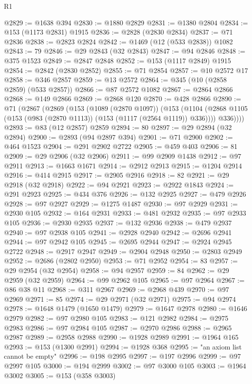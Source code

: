 \begin{lexlean}{R1}
\begin{coremodule}
{{{{{{{{{{{{{{{{{{{{{{{{{{{{{{{{{{{{{{{{{{{{{{{{{{{{{{{{{{{{{{{{{{{{{{{{{{{{{{{{{{{{{{{{{{{{{{{{{{{{{{{{{{{{{{{{{{{{{{{{{{{{{{{{{{{{{{{{{{{{{{{{{{{{{{{{{{{{{{{{{{{{{{{{{{{{{{{{{{{{{{{{{{@2829 := @1638 @394
@2830 := @1880 @2829
@2831 := @1380 @2804
@2834 := @153 (@1173 @2831) @1915
@2836 := @2828 (@2830 @2834)
@2837 := @71 @2836
@2838 := @2823 @2824
@2842 := @1469 (@12 (@533 @2838)) @1082
@2843 := 79
@2846 := @29 @2843 (@32 @2843)
@2847 := @94 @2846
@2848 := @375 @1523
@2849 := @2847 @2848
@2852 := @153 (@1117 @2849) @1915
@2854 := @2842 (@2830 @2852)
@2855 := @71 @2854
@2857 := @10 @2572 @17
@2858 := @346 @2857
@2859 := @13 @2572
@2864 := @345 (@10 (@2858 @2859) (@533 @2857))
@2866 := @87 @2572 @1082
@2867 := @2864 @2866
@2868 := @149 @2866
@2869 := @2868 @120
@2870 := @428 @2866
@2890 := @71
    (@2867
      (@2869
        (@153
          (@1089 (@2870 @1097))
          (@153
            (@1104 (@2868 @1105 (@153 (@983 (@2870 @1113)) (@153 (@1117 (@2564 @1119)) @336))))
            @336))))
@2893 := @83 (@12 @2857) @2859
@2894 := 80
@2897 := @29 @2894 (@32 @2894)
@2900 := @2893 (@94 @2897 @394)
@2901 := @71 @2900
@2902 := @464 @1523
@2904 := @291 @2902 @2722
@2905 := @459 @403
@2906 := 81
@2909 := @29 @2906 (@32 @2906)
@2911 := @99 @2909 @1438
@2912 := @97 @2911
@2913 := @1663 @1671
@2914 := @2912 @2913
@2915 := @1204 @2914
@2916 := @414 @2915
@2917 := @2905 @2916
@2918 := 82
@2921 := @29 @2918 (@32 @2918)
@2922 := @94 @2921
@2923 := @2922 @1843
@2924 := @291 @2923
@2925 := @434 @376
@2926 := @132 @2925
@2927 := @479 @2926
@2928 := @97 @2927
@2929 := @1275 @1487
@2930 := @97 @2929
@2931 := @2930 @105
@2932 := @164 @2931
@2933 := @481 @2932
@2935 := @97 @2933 @105
@2936 := @2930 @2935
@2937 := @132 @2936
@2938 := @479 @2937
@2940 := @97 @2938 @105
@2941 := @2928 @2940
@2942 := @2696 @2941
@2944 := @97 @2942 @105
@2945 := @2695 @2944
@2947 := @2924 @2945 @2722
@2948 := @2917 @2947
@2949 := @2904 @2948
@2950 := @2803 @2949
@2952 := @2686 (@2802 @2950)
@2953 := @71 @2952
@2954 := 83
@2957 := @29 @2954 (@32 @2954)
@2958 := @94 @2957
@2959 := 84
@2962 := @29 @2959 (@32 @2959)
@2964 := @99 @2962 @105
@2965 := @97 @2964
@2967 := @86 @38 @11
@2968 := @311 @2967
@2969 := @2968 @439
@2970 := @97 @2969
@2971 := 85
@2974 := @29 @2971 (@32 @2971)
@2975 := @94 @2974
@2978 := @1648 @1479 (@1650 @1479)
@2979 := @1647 @2978
@2980 := @1646 @2979
@2982 := @97 @2980 @105
@2983 := @121 @2982
@2984 := @2975 @2983
@2986 := @97 @2984 @105
@2987 := @2970 @2986
@2988 := @2965 @2987
@2989 := @2958 @2988
@2990 := @1928 @2989
@2991 := @1964 @165
@2993 := @153 (@1300 @2991)
@2994 := @1928 @368
@2995 := "an axiom list cannot be empty"
@2996 := @198 @2995
@2997 := @197 @2996
@2999 := @97 @2997 @105
@3000 := @194 @2999
@3002 := @97 @3000 @105
@3003 := @1964 @3002
@3005 := @153 (@358 @3003)
}}}}}}}}}}}}}}}}}}}}}}}}}}}}}}}}}}}}}}}}}}}}}}}}}}}}}}}}}}}}}}}}}}}}}}}}}}}}}}}}}}}}}}}}}}}}}}}}}}}}}}}}}}}}}}}}}}}}}}}}}}}}}}}}}}}}}}}}}}}}}}}}}}}}}}}}}}}}}}}}}}}}}}}}}}}}}}}}}}}}}}}}}}
\end{coremodule}
\end{lexlean}
